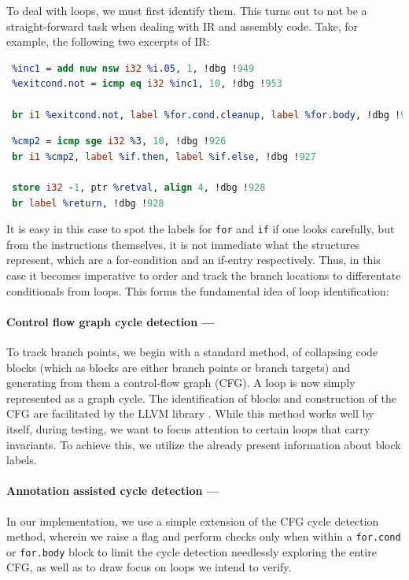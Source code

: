 \documentclass[11pt,a4paper,runningheads]{llncs}
\begin{document}
To deal with loops, we must first identify them. This turns out to not be a
straight-forward task when dealing with IR and assembly code. Take, for example,
the following two excerpts of IR:

\begin{lstlisting}[language=llvm]
 %i.05 = phi i32 [ 0, %entry ], [ %inc1, %for.body ]
 %inc1 = add nuw nsw i32 %i.05, 1, !dbg !949
 %exitcond.not = icmp eq i32 %inc1, 10, !dbg !953

 br i1 %exitcond.not, label %for.cond.cleanup, label %for.body, !dbg !947, !llvm.loop !954
\end{lstlisting}

\begin{lstlisting}[language=llvm]
 %3 = load i32, ptr %j, align 4, !dbg !924
 %cmp2 = icmp sge i32 %3, 10, !dbg !926
 br i1 %cmp2, label %if.then, label %if.else, !dbg !927
 
 store i32 -1, ptr %retval, align 4, !dbg !928
 br label %return, !dbg !928
\end{lstlisting}

It is easy in this case to spot the labels for \texttt{for} and \texttt{if} if
one looks carefully, but from the instructions themselves, it is not immediate
what the structures represent, which are a for-condition and an if-entry
respectively. Thus, in this case it becomes imperative to order and track the
branch locations to differentate conditionals from loops. This forms the
fundamental idea of loop identification: 

\paragraph{Control flow graph cycle detection ---}
%
To track branch points, we begin with a standard method, of collapsing code
blocks (which as blocks are either branch points or branch targets) and
generating from them a control-flow graph (CFG). A loop is now simply
represented as a graph cycle. The identification of blocks and construction of
the CFG are facilitated by the LLVM library \cite{clang}. While this method
works well by itself, during testing, we want to focus attention to certain
loops that carry invariants. To achieve this, we utilize the already present
information about block labels.

\paragraph{Annotation assisted cycle detection ---}
%
In our implementation, we use a simple extension of the CFG cycle detection
method, wherein we raise a flag and perform checks only when within a
\texttt{for.cond} or \texttt{for.body} block to limit the cycle detection
needlessly exploring the entire CFG, as well as to draw focus on loops we intend
to verify.
\end{document}
